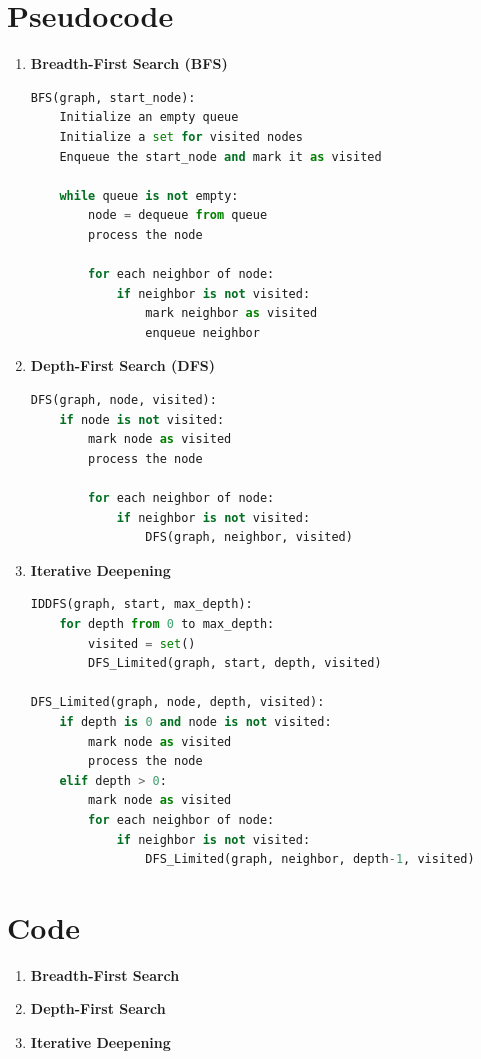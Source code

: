 \documentclass[12pt]{fphw}
\begin{document}
\section{Pseudocode}
\begin{enumerate}
  \item \textbf{Breadth-First Search (BFS)}
    \begin{lstlisting}[language=Python, tabsize=2]
BFS(graph, start_node):
    Initialize an empty queue
    Initialize a set for visited nodes
    Enqueue the start_node and mark it as visited
    
    while queue is not empty:
        node = dequeue from queue
        process the node
        
        for each neighbor of node:
            if neighbor is not visited:
                mark neighbor as visited
                enqueue neighbor
    \end{lstlisting}
  \item \textbf{Depth-First Search (DFS)}
    \begin{lstlisting}[language=Python, tabsize=2]
DFS(graph, node, visited):
    if node is not visited:
        mark node as visited
        process the node
        
        for each neighbor of node:
            if neighbor is not visited:
                DFS(graph, neighbor, visited)
    \end{lstlisting}
  \item \textbf{Iterative Deepening}
    \begin{lstlisting}[language=Python, tabsize=2]
IDDFS(graph, start, max_depth):
    for depth from 0 to max_depth:
        visited = set()
        DFS_Limited(graph, start, depth, visited)

DFS_Limited(graph, node, depth, visited):
    if depth is 0 and node is not visited:
        mark node as visited
        process the node
    elif depth > 0:
        mark node as visited
        for each neighbor of node:
            if neighbor is not visited:
                DFS_Limited(graph, neighbor, depth-1, visited)

    \end{lstlisting}
\end{enumerate}
\section{Code}
\begin{enumerate}
  \item \textbf{Breadth-First Search}
    
  \item \textbf{Depth-First Search}
    
  \item \textbf{Iterative Deepening}
    
\end{enumerate}
\end{document}
